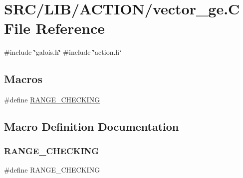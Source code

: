 \hypertarget{vector__ge_8_c}{}\section{S\+R\+C/\+L\+I\+B/\+A\+C\+T\+I\+O\+N/vector\+\_\+ge.C File Reference}
\label{vector__ge_8_c}
{\ttfamily \#include \char`\"{}galois.\+h\char`\"{}}\newline
{\ttfamily \#include \char`\"{}action.\+h\char`\"{}}\newline
\subsection*{Macros}
\begin{DoxyCompactItemize}
\item 
\#define \mbox{\hyperlink{vector__ge_8_c_aba8717f1e6e3fcf423083c7bab871bb5}{R\+A\+N\+G\+E\+\_\+\+C\+H\+E\+C\+K\+I\+NG}}
\end{DoxyCompactItemize}


\subsection{Macro Definition Documentation}
\mbox{\label{vector__ge_8_c_aba8717f1e6e3fcf423083c7bab871bb5}} 
\subsubsection{\texorpdfstring{R\+A\+N\+G\+E\+\_\+\+C\+H\+E\+C\+K\+I\+NG}{RANGE\_CHECKING}}
{\footnotesize\ttfamily \#define R\+A\+N\+G\+E\+\_\+\+C\+H\+E\+C\+K\+I\+NG}

